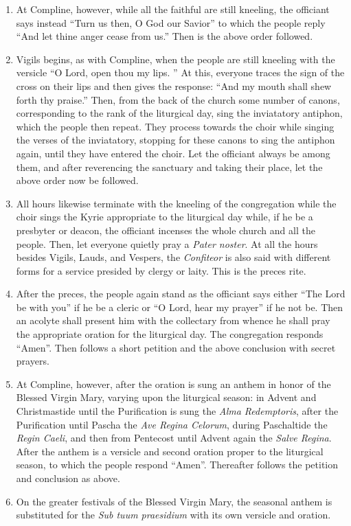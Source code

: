 \begin{enumerate}
				\item At Compline, however, while all the faithful are still kneeling, the officiant says instead \enquote{Turn us then, O God our Savior} to which the people reply \enquote{And let thine anger cease from us.} Then is the above order followed.
				
				\item Vigils begins, as with Compline, when the people are still kneeling with the versicle \enquote{O Lord, open thou my lips. } At this, everyone traces the sign of the cross on their lips and then gives the response: \enquote{And my mouth shall shew forth thy praise.} Then, from the back of the church some number of canons, corresponding to the rank of the liturgical day, sing the inviatatory antiphon, which the people then repeat. They process towards the choir while singing the verses of the inviatatory, stopping for these canons to sing the antiphon again, until they have entered the choir. Let the officiant always be among them, and after reverencing the sanctuary and taking their place, let the above order now be followed.
				
				\item All hours likewise terminate with the kneeling of the congregation while the choir sings the Kyrie appropriate to the liturgical day while, if he be a presbyter or deacon, the officiant incenses the whole church and all the people. Then, let everyone quietly pray a \textit{Pater noster}. At all the hours besides Vigils, Lauds, and Vespers, the \textit{Confiteor} is also said with different forms for a service presided by clergy or laity. This is the preces rite.
				
				\item After the preces, the people again stand as the officiant says either \enquote{The Lord be with you} if he be a cleric or \enquote{O Lord, hear my prayer} if he not be. Then an acolyte shall present him with the collectary from whence he shall pray the appropriate oration for the liturgical day. The congregation responds \enquote{Amen}. Then follows a short petition and the above conclusion with secret prayers.
				
				\item At Compline, however, after the oration is sung an anthem in honor of the Blessed Virgin Mary, varying upon the liturgical season: in Advent and Christmastide until the Purification is sung the \textit{Alma Redemptoris}, after the Purification until Pascha the \textit{Ave Regina Celorum}, during Paschaltide the \textit{Regin Caeli}, and then from Pentecost until Advent again the \textit{Salve Regina}. After the anthem is a versicle and second oration proper to the liturgical season, to which the people respond \enquote{Amen}. Thereafter follows the petition and conclusion as above.
				
				\item On the greater festivals of the Blessed Virgin Mary, the seasonal anthem is substituted for the \textit{Sub tuum praesidium} with its own versicle and oration.
			\end{enumerate}
